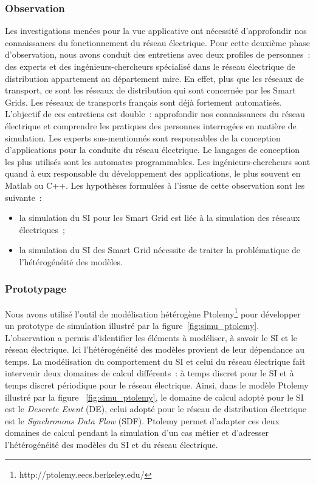 				\subsubsection{Observation}
				Les investigations menées pour la vue applicative ont nécessité d'approfondir nos connaissances du fonctionnement du réseau électrique. Pour cette deuxième phase d'observation, nous avons conduit des entretiens avec deux profiles de personnes~: des experts et des ingénieurs-chercheurs spécialisé dans le réseau électrique de distribution  appartement au département \gls{mire}. En effet, plus que les réseaux de transport, ce sont les réseaux de distribution qui sont concernée par les Smart Grids. Les réseaux de transports français sont déjà fortement automatisés. 
				L'objectif de ces entretiens est double~: approfondir nos connaissances du réseau électrique et comprendre les pratiques des personnes interrogées en matière de simulation.
				Les experts sus-mentionnés sont responsables de la conception d'applications pour la conduite du réseau électrique. Le langages de conception les plus utilisés sont les automates programmables. Les ingénieurs-chercheurs sont quand à eux responsable du développement des applications, le plus souvent en Matlab ou  C++.
				Les hypothèses formulées à l'issue de cette observation sont les suivante~:
				\begin{itemize}
					\item la simulation du SI pour les Smart Grid est liée à la simulation des réseaux électriques~;
					\item la simulation du SI des Smart Grid nécessite de traiter la problématique de l'hétérogénéité des modèles.
				\end{itemize}
				
				\subsubsection{Prototypage}
				
				Nous avons utilisé l'outil de modélisation hétérogène Ptolemy\footnote{http://ptolemy.eecs.berkeley.edu/}  pour développer un prototype de simulation illustré par la figure~\ref{fig:simu_ptolemy}. L'observation a permis d'identifier les éléments à modéliser, à savoir le SI et le réseau électrique. Ici l'hétérogénéité des modèles provient de leur dépendance au temps. La modélisation du comportement du SI et celui du réseau électrique fait intervenir deux domaines de calcul différents~: à temps discret pour le SI et à temps discret périodique pour le réseau électrique. 
				Ainsi, dans le modèle Ptolemy illustré par la figure ~\ref{fig:simu_ptolemy}, le domaine de calcul adopté pour le SI est le \textit{Descrete Event} (DE), celui adopté pour le réseau de distribution électrique est le \textit{Synchronous Data Flow} (SDF). Ptolemy permet d'adapter ces deux domaines de calcul pendant la simulation d'un cas métier et d'adresser l'hétérogénéité des modèles du SI et du réseau électrique. 
				
